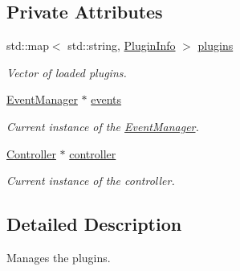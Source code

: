 \subsection*{Private Attributes}
\begin{DoxyCompactItemize}
\item 
\hypertarget{classPluginManager_a4a7dea3948d652d9a4428a237d5af805}{std\-::map$<$ std\-::string, \hyperlink{structPluginInfo}{Plugin\-Info} $>$ \hyperlink{classPluginManager_a4a7dea3948d652d9a4428a237d5af805}{plugins}}\label{classPluginManager_a4a7dea3948d652d9a4428a237d5af805}

\begin{DoxyCompactList}\small\item\em Vector of loaded plugins. \end{DoxyCompactList}\item 
\hypertarget{classPluginManager_a7966d86165aaa504ae4dd12f084d4cfa}{\hyperlink{classEventManager}{Event\-Manager} $\ast$ \hyperlink{classPluginManager_a7966d86165aaa504ae4dd12f084d4cfa}{events}}\label{classPluginManager_a7966d86165aaa504ae4dd12f084d4cfa}

\begin{DoxyCompactList}\small\item\em Current instance of the \hyperlink{classEventManager}{Event\-Manager}. \end{DoxyCompactList}\item 
\hypertarget{classPluginManager_a3b08105f2c52f52d21d293fe0045ae1f}{\hyperlink{structController}{Controller} $\ast$ \hyperlink{classPluginManager_a3b08105f2c52f52d21d293fe0045ae1f}{controller}}\label{classPluginManager_a3b08105f2c52f52d21d293fe0045ae1f}

\begin{DoxyCompactList}\small\item\em Current instance of the controller. \end{DoxyCompactList}\end{DoxyCompactItemize}


\subsection{Detailed Description}
Manages the plugins. 

